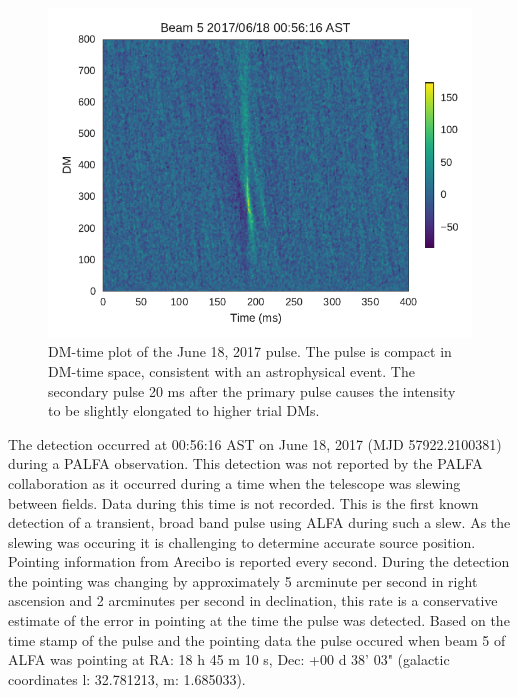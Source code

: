 \documentclass[a4paper,fleqn,usenatbib]{mnras}
\begin{document}
\begin{figure}
    \includegraphics[width=1.0\linewidth]{figures/Beam5_fb_D20170618T005616_buffer2_dmspace.pdf}
    \caption{DM-time plot of the June 18, 2017 pulse. The pulse is compact in
    DM-time space, consistent with an astrophysical event. The secondary pulse
    20 ms after the primary pulse causes the intensity to be slightly elongated
    to higher trial DMs.
    }
    \label{fig:D20170618_dmspace}
\end{figure}

The detection occurred at 00:56:16 AST on June 18, 2017 (MJD 57922.2100381)
during a PALFA observation. This detection was not reported by the PALFA
collaboration as it occurred during a time when the telescope was slewing between
fields. Data during this time is not recorded. This is the first known detection
of a transient, broad band pulse using ALFA during such a slew. As the slewing
was occuring it is challenging to determine accurate source position. Pointing
information from Arecibo is reported every second. During the detection the
pointing was changing by approximately 5 arcminute per second in right ascension
and 2 arcminutes per second in declination, this rate is a conservative estimate
of the error in pointing at the time the pulse was detected. Based on the time
stamp of the pulse and the pointing data the pulse occured when beam 5 of ALFA
was pointing at RA: 18 h 45 m 10 s, Dec: +00 d 38' 03" (galactic coordinates l:
32.781213, m: 1.685033).
\end{document}
